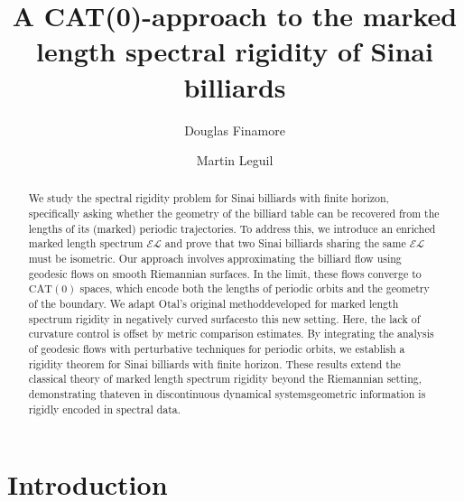 \documentclass[reqno,11pt]{amsart}
\begin{document}
%
    \title[Spectral rigidity of Sinai billiards]{A CAT(0)-approach to the marked length spectral rigidity of Sinai billiards}
    
    \author{Douglas Finamore}
    \address{Instituto de Matem\'atica, Estat\'istica e Computa\c{c}\~ao Cient\'ifica - UNICAMP\\
    	Rua S\'ergio Buarque de Holanda, 651 | 13083-859, Campinas, SP, Brasil.}

     
    \author{Martin Leguil}
    \address{Centre de Math\'ematiques Laurent Schwartz - \'Ecole Polytechnique\\
    	Route de Saclay, 91128 Palaiseau Cedex, France.}
%

\begin{abstract} 
We study the spectral rigidity problem for Sinai billiards with finite horizon, specifically asking whether the geometry of the billiard table can be recovered from the lengths of its (marked) periodic trajectories.
To address this, we introduce an enriched marked length spectrum $\mathcal{EL}$ and prove that two Sinai billiards sharing the same $\mathcal{EL}$ must be isometric.
Our approach involves approximating the billiard flow using geodesic flows on smooth Riemannian surfaces. In the limit, these flows converge to $\mathrm{CAT}(0)$ spaces, which encode both the lengths of periodic orbits and the geometry of the boundary. We adapt Otal’s original method\textemdash developed for marked length spectrum rigidity in negatively curved surfaces\textemdash to this new setting. Here, the lack of curvature control is offset by metric comparison estimates.
By integrating the analysis of geodesic flows with perturbative techniques for periodic orbits, we establish a rigidity theorem for Sinai billiards with finite horizon.
These results extend the classical theory of marked length spectrum rigidity beyond the Riemannian setting, demonstrating that\textemdash even in discontinuous dynamical systems\textemdash geometric information is rigidly encoded in spectral data. 
\end{abstract}
\maketitle

\tableofcontents

\section{Introduction}
\end{document}
